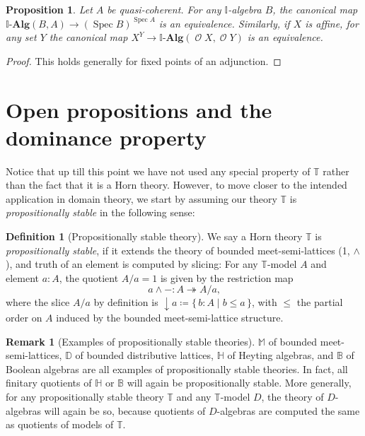 \documentclass[a4paper,12pt]{amsart}
\newtheorem{proposition}[theorem]{Proposition}
\theoremstyle{definition}
\newtheorem{definition}[theorem]{Definition}
\newtheorem{remark}[theorem]{Remark}
\newcommand{\mc}[1]{\mathcal{#1}}
\newcommand{\mb}[1]{\mathbf{#1}}
\newcommand{\mbb}[1]{\mathbb{#1}}
\newcommand{\T}{\mbb T}
\newcommand{\I}{\mbb I}
\newcommand{\alg}{\text{-}\mb{Alg}}
\newcommand{\scomp}[2]{\{\,#1\mid#2\,\}}
\newcommand{\surj}{\twoheadrightarrow}
\newcommand{\cv}{\operatorname{\downarrow}}
\newcommand{\spec}{\operatorname{Spec}}
\newcommand{\opens}{\operatorname{\mc{O}}} %
\begin{document}
\begin{proposition}\label{prop:duality}
  Let $A$ be quasi-coherent. For any $\I$-algebra $B$, the canonical map $\I\alg(B,A) \to (\spec B)^{\spec A}$ is an equivalence. Similarly, if $X$ is affine, for any set $Y$ the canonical map $X^Y \to \I\alg(\opens X,\opens Y)$ is an equivalence.
\end{proposition}
\begin{proof}
  This holds generally for fixed points of an adjunction.
\end{proof}


\section{Open propositions and the dominance property}\label{sec:dominance}

Notice that up till this point we have not used any special property of $\T$ rather than the fact that it is a Horn theory. However, to move closer to the intended application in domain theory, we start by assuming our theory $\T$ is \emph{propositionally stable} in the following sense: 

\begin{definition}[Propositionally stable theory]\label{defn:propositional}
  We say a Horn theory $\T$ is \emph{propositionally stable}, if it extends the theory of bounded meet-semi-lattices (1, $\wedge$), and truth of an element is computed by slicing: For any $\T$-model $A$ and element $a:A$, the quotient $A/a=1$ is given by the restriction map
  \[ {a \wedge -} \colon A \surj A/a\text{,} \]
  where the slice $A/a$ by definition is ${\cv} a \coloneq \scomp{b:A}{b\le a}$, with $\le$ the partial order on $A$ induced by the bounded meet-semi-lattice structure.
\end{definition}

\begin{remark}[Examples of propositionally stable theories]
  $\mbb M$ of bounded meet-semi-lattices, $\mbb D$ of bounded distributive lattices, $\mbb H$ of Heyting algebras, and $\mbb B$ of Boolean algebras are all examples of propositionally stable theories. In fact, all finitary quotients of $\mbb H$ or $\mbb B$ will again be propositionally stable. More generally, for any propositionally stable theory $\T$ and any $\T$-model $D$, the theory of $D$-algebras will again be so, because quotients of $D$-algebras are computed the same as quotients of models of $\T$.
\end{remark}
\end{document}
